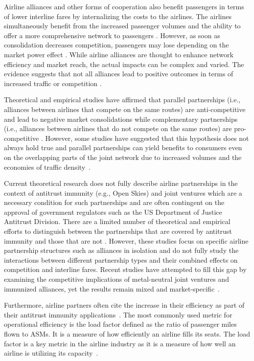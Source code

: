 \documentclass[preprint,times]{elsarticle}
\begin{document}
Airline alliances and other forms of cooperation also benefit passengers in terms of lower interline fares by internalizing the costs to the airlines. The airlines simultaneously benefit from the increased passenger volumes and the ability to offer a more comprehensive network to passengers \citep{Brueckner2000}. However, as soon as consolidation decreases competition, passengers may lose depending on the market power effect \citep{Bilotkach2019}. While airline alliances are thought to enhance network efficiency and market reach, the actual impacts can be complex and varied. The evidence suggests that not all alliances lead to positive outcomes in terms of increased traffic or competition \citep{OumParkZhan96,Hanl07,Pitfield2007}. 

Theoretical and empirical studies have affirmed that parallel partnerships (i.e., alliances between airlines that compete on the same routes) are anti-competitive and lead to negative market consolidations while complementary partnerships (i.e., alliances between airlines that do not compete on the same routes) are pro-competitive \citep{OumParkKimYu04,Bilotkach2019a}. However, some studies have suggested that this hypothesis does not always hold true and parallel partnerships can yield benefits to consumers even on the overlapping parts of the joint network due to increased volumes and the economies of traffic density~\citep{Brueckner2000}.

Current theoretical research does not fully describe airline partnerships in the context of antitrust immunity (e.g., Open Skies) and joint ventures which are a necessary condition for such partnerships and are often contingent on the approval of government regulators such as the US Department of Justice Antitrust Division. There are a limited number of theoretical and empirical efforts to distinguish between the partnerships that are covered by antitrust immunity and those that are not \citep{Brueckner2003,Bilotkach2005,Bilotkach2011}. However, these studies focus on specific airline partnership structures such as alliances in isolation and do not fully study the interactions between different partnership types and their combined effects on competition and interline fares. Recent studies have attempted to fill this gap by examining the competitive implications of metal-neutral joint ventures and immunized alliances, yet the results remain mixed and market-specific~\citep{CalzEilaIsra17}.

Furthermore, airline partners often cite the increase in their efficiency as part of their antitrust immunity applications~\citep{OumYuZhan01, Pitfield2007}. The most commonly used metric for operational efficiency is the load factor defined as the ratio of passenger miles flown to \acp{ASM}. It is a measure of how efficiently an airline fills its seats. The load factor is a key metric in the airline industry as it is a measure of how well an airline is utilizing its capacity~\citep{DanaGree19}.
\end{document}
